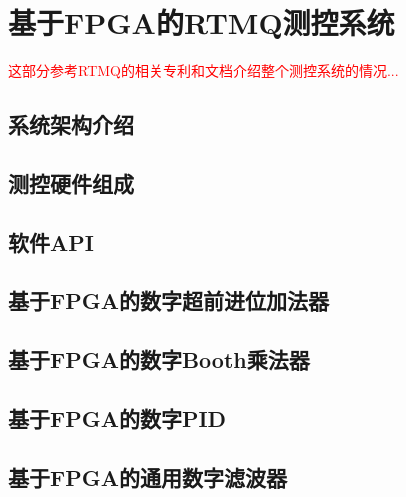 
\chapter[基于FPGA的RTMQ测控系统]{基于FPGA的RTMQ测控系统}

\textcolor{red}{\small
这部分参考RTMQ的相关专利和文档介绍整个测控系统的情况... 
}
\section[系统架构介绍]{系统架构介绍}

\section[测控硬件组成]{测控硬件组成}

\section[软件API]{软件API}

\section[基于FPGA的数字超前进位加法器]{基于FPGA的数字超前进位加法器}

\section[基于FPGA的数字Booth乘法器]{基于FPGA的数字Booth乘法器}

\section[基于FPGA的数字PID]{基于FPGA的数字PID}

\section[基于FPGA的通用数字滤波器]{基于FPGA的通用数字滤波器}




